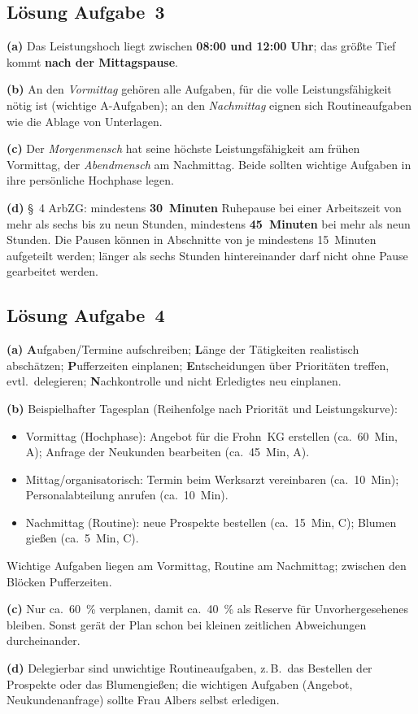 \documentclass[11pt, a4paper]{article}
\begin{document}
\subsection*{Lösung Aufgabe~3}
\begin{loesung}
\textbf{(a)} Das Leistungshoch liegt zwischen \textbf{08:00 und 12:00 Uhr}; das größte
Tief kommt \textbf{nach der Mittagspause}.

\textbf{(b)} An den \emph{Vormittag} gehören alle Aufgaben, für die volle
Leistungsfähigkeit nötig ist (wichtige A-Aufgaben); an den \emph{Nachmittag} eignen sich
Routineaufgaben wie die Ablage von Unterlagen.

\textbf{(c)} Der \emph{Morgenmensch} hat seine höchste Leistungsfähigkeit am frühen
Vormittag, der \emph{Abendmensch} am Nachmittag. Beide sollten wichtige Aufgaben in ihre
persönliche Hochphase legen.

\textbf{(d)} §~4 ArbZG: mindestens \textbf{30~Minuten} Ruhepause bei einer Arbeitszeit
von mehr als sechs bis zu neun Stunden, mindestens \textbf{45~Minuten} bei mehr als neun
Stunden. Die Pausen können in Abschnitte von je mindestens 15~Minuten aufgeteilt werden;
länger als sechs Stunden hintereinander darf nicht ohne Pause gearbeitet werden.
\end{loesung}

\subsection*{Lösung Aufgabe~4}
\begin{loesung}
\textbf{(a)} \textbf{A}ufgaben/Termine aufschreiben; \textbf{L}änge der Tätigkeiten
realistisch abschätzen; \textbf{P}ufferzeiten einplanen; \textbf{E}ntscheidungen über
Prioritäten treffen, evtl.\ delegieren; \textbf{N}achkontrolle und nicht Erledigtes neu
einplanen.

\textbf{(b)} Beispielhafter Tagesplan (Reihenfolge nach Priorität und Leistungskurve):
\begin{itemize}[itemsep=0pt]
  \item Vormittag (Hochphase): Angebot für die Frohn~KG erstellen (ca.\ 60~Min, A); Anfrage der Neukunden bearbeiten (ca.\ 45~Min, A).
  \item Mittag/organisatorisch: Termin beim Werksarzt vereinbaren (ca.\ 10~Min); Personalabteilung anrufen (ca.\ 10~Min).
  \item Nachmittag (Routine): neue Prospekte bestellen (ca.\ 15~Min, C); Blumen gießen (ca.\ 5~Min, C).
\end{itemize}
Wichtige Aufgaben liegen am Vormittag, Routine am Nachmittag; zwischen den Blöcken
Pufferzeiten.

\textbf{(c)} Nur ca.\ 60~\% verplanen, damit ca.\ 40~\% als Reserve für Unvorhergesehenes
bleiben. Sonst gerät der Plan schon bei kleinen zeitlichen Abweichungen durcheinander.

\textbf{(d)} Delegierbar sind unwichtige Routineaufgaben, z.\,B.\ das Bestellen der
Prospekte oder das Blumengießen; die wichtigen Aufgaben (Angebot, Neukundenanfrage)
sollte Frau Albers selbst erledigen.
\end{loesung}
\end{document}
